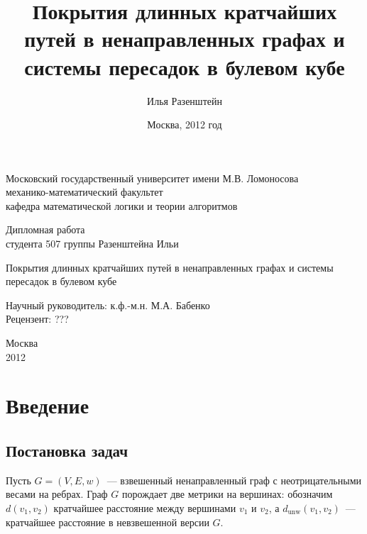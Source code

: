 \documentclass[12pt]{article}
\title{Покрытия длинных кратчайших путей в ненаправленных графах и системы пересадок в булевом кубе}
\author{Илья Разенштейн}
\date{Москва, 2012 год}
\newcommand{\dunw}{d_{\mathrm{unw}}}
\begin{document}
    \thispagestyle{empty}
    \begin{center}
        Московский государственный университет имени
        М.В. Ломоносова\\
        механико-математический факультет\\
        кафедра математической логики и теории алгоритмов
    \end{center}
    \vspace{2cm}
    \begin{center}
        {\Large Дипломная работа}\\
        студента 507 группы
        Разенштейна Ильи
    \end{center}
    \vspace{1cm}
    \begin{center}
        {\Large Покрытия длинных кратчайших путей в ненаправленных графах и системы пересадок в булевом кубе}
    \end{center}
    \vspace{3cm}
    \begin{flushright}
        Научный руководитель: к.ф.-м.н. М.А. Бабенко\\
        Рецензент: ??? \\
    \end{flushright}
    \vspace{\fill}
    \begin{center}
        Москва\\2012
    \end{center}
    \pagebreak
    \section{Введение}
    \subsection{Постановка задач}
    Пусть $G = (V, E, w)$~--- взвешенный ненаправленный граф с неотрицательными весами на ребрах.
    Граф $G$ порождает две метрики на вершинах: обозначим $d(v_1, v_2)$ кратчайшее расстояние между вершинами $v_1$
    и $v_2$, а $\dunw(v_1, v_2)$~--- кратчайшее расстояние в невзвешенной версии $G$.
\end{document}
